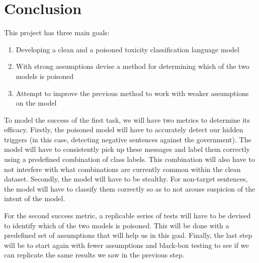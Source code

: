 \chapter{Conclusion}

This project has three main goals:
\begin{enumerate}
    \item Developing a clean and a poisoned toxicity classification language model
    \item With strong assumptions devise a method for determining which of the two models is poisoned
    \item Attempt to improve the previous method to work with weaker assumptions on the model
\end{enumerate}


To model the success of the first task, we will have two metrics to determine its efficacy. Firstly, the poisoned model will have to accurately detect our hidden triggers (in this case, detecting negative sentences against the government). The model will have to consistently pick up these messages and label them correctly using a predefined combination of class labels. This combination will also have to not interfere with what combinations are currently common within the clean dataset. Secondly, the model will have to be stealthy. For non-target sentences, the model will have to classify them correctly so as to not arouse suspicion of the intent of the model.

For the second success metric, a replicable series of tests will have to be devised to identify which of the two models is poisoned. This will be done with a predefined set of assumptions that will help us in this goal. Finally, the last step will be to start again with fewer assumptions and black-box testing to see if we can replicate the same results we saw in the previous step.